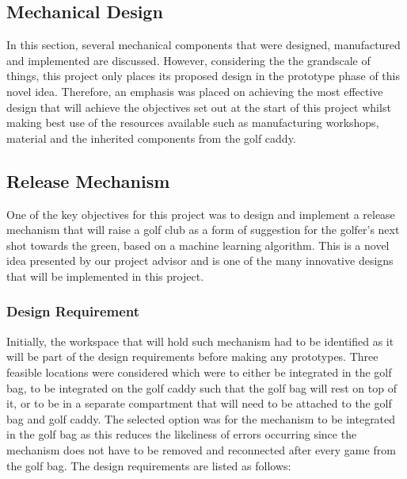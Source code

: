 \documentclass[11pt,landscape]{article}
\begin{document}
\newpage
\begin{multicols}{2}
    
\section{Mechanical Design}
    In this section, several mechanical components that were designed,
    manufactured and implemented are discussed. However, considering the the
    grandscale of things, this project only places its proposed design in the
    prototype phase of this novel idea. Therefore, an emphasis was placed on
    achieving the most effective design that will achieve the objectives set out
    at the start of this project whilst making best use of the resources
    available such as manufacturing workshops, material and the inherited
    components from the golf caddy. 
    
    \subsection{Release Mechanism}
    One of the key objectives for this project was to design and implement a
    release mechanism that will raise a golf club as a form of suggestion for
    the golfer’s next shot towards the green, based on a machine learning
    algorithm. This is a novel idea presented by our project advisor and is one
    of the many innovative designs that will be implemented in this project.
    
    \subsubsection{Design Requirement}
    Initially, the workspace that will hold such mechanism had to be identified
    as it will be part of the design requirements before making any prototypes.
    Three feasible locations were considered which were to either be integrated
    in the golf bag, to be integrated on the golf caddy such that the golf bag
    will rest on top of it, or to be in a separate compartment that will need to
    be attached to the golf bag and golf caddy. The selected option was for the
    mechanism to be integrated in the golf bag as this reduces the likeliness of
    errors occurring since the mechanism does not have to be removed and
    reconnected after every game from the golf bag. The design requirements are
    listed as follows:
    

\end{multicols}
\end{document}
